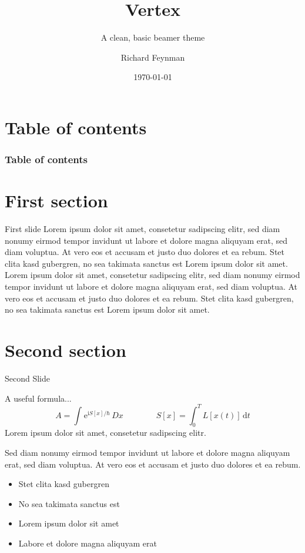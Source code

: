 \documentclass[compress,aspectratio=1610]{beamer}
\title{Vertex}
\subtitle{A clean, basic beamer theme}
\date{\today}
\author{Richard Feynman}
\begin{document}
\maketitle

\section*{Table of contents}
\begin{frame}
	\frametitle{Table of contents}
  \centering
	\tableofcontents[hideallsubsections]
\end{frame}

\section{First section}
\begin{frame}{First slide}
	Lorem ipsum dolor sit amet, consetetur sadipscing elitr, sed diam nonumy eirmod tempor invidunt ut labore et dolore magna aliquyam erat, sed diam voluptua. At vero eos et accusam et justo duo dolores et ea rebum. Stet clita kasd gubergren, no sea takimata sanctus est Lorem ipsum dolor sit amet. Lorem  ipsum dolor sit amet, consetetur sadipscing elitr, sed diam nonumy eirmod tempor invidunt ut labore et dolore magna aliquyam erat, sed diam voluptua. At vero eos et accusam et justo duo dolores et ea rebum. Stet clita kasd gubergren, no sea takimata sanctus est Lorem ipsum dolor sit amet.
\end{frame}

\section{Second section}
\begin{frame}{Second Slide}
  \begin{block}{A useful formula...}
    \begin{equation*}
      A = \int^{}\mathrm{e}^{\mathrm{i} S[x] / \hbar}\,Dx \hspace{4em} S[x] = \int^{T}_0 L[x(t)]\,\mathrm{d}t
    \end{equation*}
    \centering
Lorem ipsum dolor sit amet, consetetur sadipscing elitr.
  \end{block}
  \begin{multicols}{2}
Sed diam nonumy eirmod tempor invidunt ut labore et dolore magna aliquyam erat, sed diam voluptua. At vero eos et accusam et justo duo dolores et ea rebum.
  \columnbreak
  \begin{itemize}
    \item Stet clita kasd gubergren
    \item No sea takimata sanctus est
    \item Lorem ipsum dolor sit amet
    \item Labore et dolore magna aliquyam erat
  \end{itemize}
  \end{multicols}
\end{frame}
\end{document}
